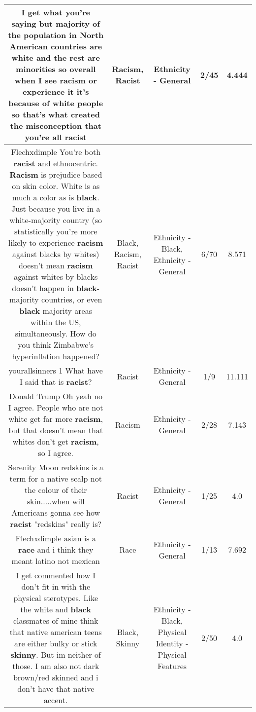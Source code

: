 \documentclass[11pt]{article}
\newlength\mylength
\begin{document}
\begin{center}
\begin{longtable}{|C{.65\mylength}|C{.30\mylength}|C{.12\mylength}|C{.12\mylength}|C{.12\mylength}|}
  \small I get what you're saying but majority of the population in North American countries are white and the rest are minorities so overall when I see \textbf{racism} or experience it it's because of white people so that's what created the misconception that you're all racist\normalsize   & Racism, Racist & Ethnicity - General & 2/45 & 4.444 \\  \hline
  \small Flechxdimple You're both \textbf{racist} and ethnocentric. \textbf{Racism} is prejudice based on skin color. White is as much a color as is \textbf{black}. Just because you live in a white-majority country (so statistically you're more likely to experience \textbf{racism} against blacks by whites) doesn't mean \textbf{racism} against whites by blacks doesn't happen in \textbf{black}-majority countries, or even \textbf{black} majority areas within the US, simultaneously. How do you think Zimbabwe's hyperinflation happened?\normalsize   & Black, Racism, Racist & Ethnicity - Black, Ethnicity - General & 6/70 & 8.571 \\  \hline
  \small yourallsinners 1 What have I said that is \textbf{racist}?\normalsize   & Racist & Ethnicity - General & 1/9 & 11.111 \\  \hline
  \small Donald Trump Oh yeah no I agree. People who are not white get far more \textbf{racism}, but that doesn't mean that whites don't get \textbf{racism}, so I agree.\normalsize   & Racism & Ethnicity - General & 2/28 & 7.143 \\  \hline
  \small Serenity Moon redskins is a term for a native scalp not the colour of their skin.....when will Americans gonna see how \textbf{racist} "redskins" really is?\normalsize   & Racist & Ethnicity - General & 1/25 & 4.0 \\  \hline
  \small Flechxdimple asian is a \textbf{race} and i think they meant latino not mexican\normalsize   & Race & Ethnicity - General & 1/13 & 7.692 \\  \hline
  \small I get commented how I don't fit in with the physical sterotypes. Like the white and \textbf{black} classmates of mine think that native american teens are either bulky or stick \textbf{skinny}. But im neither of those. I am also not dark brown/red skinned and i don't have that native accent.\normalsize   & Black, Skinny & Ethnicity - Black, Physical Identity - Physical Features & 2/50 & 4.0 \\  \hline

\end{longtable}
\end{center}
\end{document}
